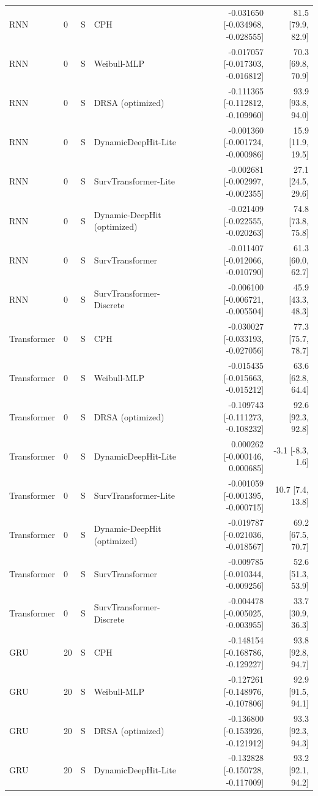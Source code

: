 \begin{longtable}{lll p{3.0cm} rr}
RNN & 0 & S & CPH & -0.031650 [-0.034968, -0.028555] & 81.5 [79.9, 82.9]\\
RNN & 0 & S & Weibull-MLP & -0.017057 [-0.017303, -0.016812] & 70.3 [69.8, 70.9]\\
RNN & 0 & S & DRSA (optimized) & -0.111365 [-0.112812, -0.109960] & 93.9 [93.8, 94.0]\\
RNN & 0 & S & DynamicDeepHit-Lite & -0.001360 [-0.001724, -0.000986] & 15.9 [11.9, 19.5]\\
RNN & 0 & S & SurvTransformer-Lite & -0.002681 [-0.002997, -0.002355] & 27.1 [24.5, 29.6]\\
RNN & 0 & S & Dynamic-DeepHit (optimized) & -0.021409 [-0.022555, -0.020263] & 74.8 [73.8, 75.8]\\
RNN & 0 & S & SurvTransformer & -0.011407 [-0.012066, -0.010790] & 61.3 [60.0, 62.7]\\
RNN & 0 & S & SurvTransformer-Discrete & -0.006100 [-0.006721, -0.005504] & 45.9 [43.3, 48.3]\\
Transformer & 0 & S & CPH & -0.030027 [-0.033193, -0.027056] & 77.3 [75.7, 78.7]\\
Transformer & 0 & S & Weibull-MLP & -0.015435 [-0.015663, -0.015212] & 63.6 [62.8, 64.4]\\
Transformer & 0 & S & DRSA (optimized) & -0.109743 [-0.111273, -0.108232] & 92.6 [92.3, 92.8]\\
Transformer & 0 & S & DynamicDeepHit-Lite & 0.000262 [-0.000146, 0.000685] & -3.1 [-8.3, 1.6]\\
Transformer & 0 & S & SurvTransformer-Lite & -0.001059 [-0.001395, -0.000715] & 10.7 [7.4, 13.8]\\
Transformer & 0 & S & Dynamic-DeepHit (optimized) & -0.019787 [-0.021036, -0.018567] & 69.2 [67.5, 70.7]\\
Transformer & 0 & S & SurvTransformer & -0.009785 [-0.010344, -0.009256] & 52.6 [51.3, 53.9]\\
Transformer & 0 & S & SurvTransformer-Discrete & -0.004478 [-0.005025, -0.003955] & 33.7 [30.9, 36.3]\\
GRU & 20 & S & CPH & -0.148154 [-0.168786, -0.129227] & 93.8 [92.8, 94.7]\\
GRU & 20 & S & Weibull-MLP & -0.127261 [-0.148976, -0.107806] & 92.9 [91.5, 94.1]\\
GRU & 20 & S & DRSA (optimized) & -0.136800 [-0.153926, -0.121912] & 93.3 [92.3, 94.3]\\
GRU & 20 & S & DynamicDeepHit-Lite & -0.132828 [-0.150728, -0.117009] & 93.2 [92.1, 94.2]\\

\end{longtable}
